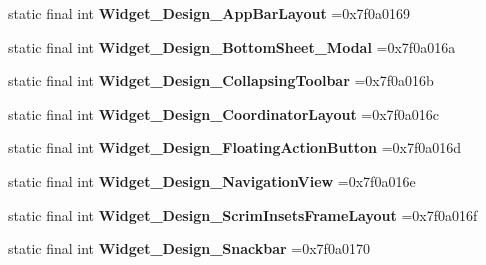 \begin{DoxyCompactItemize}
\item 
\mbox{\label{classproject4_1_1xaria_1_1R_1_1style_a4b9a87a9e1bd3e502d1321e2ee7cf0d2}} 
static final int {\bfseries Widget\+\_\+\+Design\+\_\+\+App\+Bar\+Layout} =0x7f0a0169
\item 
\mbox{\label{classproject4_1_1xaria_1_1R_1_1style_a77dc747d296548d51db56d71792e9b91}} 
static final int {\bfseries Widget\+\_\+\+Design\+\_\+\+Bottom\+Sheet\+\_\+\+Modal} =0x7f0a016a
\item 
\mbox{\label{classproject4_1_1xaria_1_1R_1_1style_aedc02387509a0a72cdf7ae2fe2a10e3f}} 
static final int {\bfseries Widget\+\_\+\+Design\+\_\+\+Collapsing\+Toolbar} =0x7f0a016b
\item 
\mbox{\label{classproject4_1_1xaria_1_1R_1_1style_abe8f4032e438df4807f651086a5f20c6}} 
static final int {\bfseries Widget\+\_\+\+Design\+\_\+\+Coordinator\+Layout} =0x7f0a016c
\item 
\mbox{\label{classproject4_1_1xaria_1_1R_1_1style_a891636c192d0483056f093bd534b84c4}} 
static final int {\bfseries Widget\+\_\+\+Design\+\_\+\+Floating\+Action\+Button} =0x7f0a016d
\item 
\mbox{\label{classproject4_1_1xaria_1_1R_1_1style_a45c0d6188e7d813784b610192a4ca94f}} 
static final int {\bfseries Widget\+\_\+\+Design\+\_\+\+Navigation\+View} =0x7f0a016e
\item 
\mbox{\label{classproject4_1_1xaria_1_1R_1_1style_acb2334aafd668a275172275dfe4556b7}} 
static final int {\bfseries Widget\+\_\+\+Design\+\_\+\+Scrim\+Insets\+Frame\+Layout} =0x7f0a016f
\item 
\mbox{\label{classproject4_1_1xaria_1_1R_1_1style_a87c5254e9447427f46c6a13898b48633}} 
static final int {\bfseries Widget\+\_\+\+Design\+\_\+\+Snackbar} =0x7f0a0170
\item 
\mbox{\label{classproject4_1_1xaria_1_1R_1_1style_a2a0ad2560c654b9eae03ef23d5398325}} 

\end{DoxyCompactItemize}
